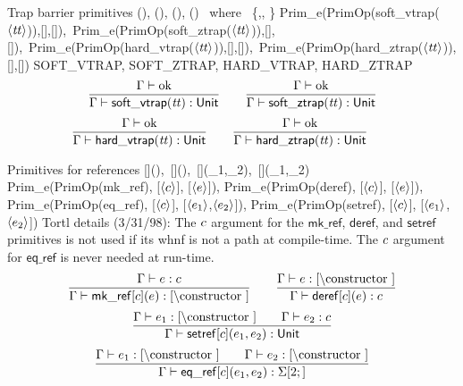\documentclass[12pt,twoside,fleqn]{article}
\begin{document}
\newcommand{\ttt}{\mathit{tt}}
  {Trap barrier primitives}
  {(\ttt),
   (\ttt),
   (\ttt),
   (\ttt)\quad
     \mbox{\ where\ } \ttt\in\{,,
                               \}}
  {Prim\_e(PrimOp(soft\_vtrap($\translate{\ttt}$)),[],[]),\
   Prim\_e(PrimOp(soft\_ztrap($\translate{\ttt}$)),[],[]),\
   Prim\_e(PrimOp(hard\_vtrap($\translate{\ttt}$)),[],[]),\
   Prim\_e(PrimOp(hard\_ztrap($\translate{\ttt}$)),[],[])}
  {SOFT\_VTRAP, SOFT\_ZTRAP, HARD\_VTRAP, HARD\_ZTRAP}
  { }
  { }
  {\[
   \frac{\validcontext{\context}}
        {\validexpression{\context}{\mathsf{soft\_vtrap}(\ttt)}{\cunit}}
   \qquad
   \frac{\validcontext{\context}}
        {\validexpression{\context}{\mathsf{soft\_ztrap}(\ttt)}{\cunit}}
   \]
   \[
   \frac{\validcontext{\context}}
        {\validexpression{\context}{\mathsf{hard\_vtrap}(\ttt)}{\cunit}}
   \qquad
   \frac{\validcontext{\context}}
        {\validexpression{\context}{\mathsf{hard\_ztrap}(\ttt)}{\cunit}}
   \qquad
   \] }

  {Primitives for references}
  {[\constructor](\expression),\
   [\constructor](\expression),\
   [\constructor](\expression_1,\expression_2),\
   [\constructor](\expression_1,\expression_2)}
  {Prim\_e(PrimOp(mk\_ref), [$\langle{c}\rangle$], 
       [$\langle{e}\rangle$]),
   Prim\_e(PrimOp(deref), [$\langle{c}\rangle$], 
       [$\langle{e}\rangle$]),
   Prim\_e(PrimOp(eq\_ref), [$\langle{c}\rangle$], 
       [$\langle{e_1}\rangle$,$\langle{e_2}\rangle$]),
   Prim\_e(PrimOp(setref), [$\langle{c}\rangle$], 
       [$\langle{e_1}\rangle$,$\langle{e_2}\rangle$])}
  {}
  {Tortl details (3/31/98):
   The $c$ argument for the $\mathsf{mk\_ref}$, $\mathsf{deref}$,
   and $\mathsf{setref}$ primitives is not used if its whnf is
   not a path at compile-time.  The $c$ argument for
   $\mathsf{eq\_ref}$ is never needed at run-time. }
  {\[
   \frac{\validexpression{\context}{\expression}{\constructor}}
        {\validexpression{\context}
             {\mathsf{mk\_ref}[\constructor](\expression)}
             {\cref{\constructor}}}
   \qquad
   \frac{\validexpression{\context}{\expression}{\cref{\constructor}}}
        {\validexpression{\context}
             {\mathsf{deref}[\constructor](\expression)}
             {\constructor}}
   \]
   \[
   \frac{\validexpression{\context}{\expression_1}{\cref{\constructor}}
         \qquad
         \validexpression{\context}{\expression_2}{\constructor}}
        {\validexpression{\context}
             {\mathsf{setref}[\constructor](\expression_1,\expression_2)}
             {\cunit}}
   \]
   \[
   \frac{\validexpression{\context}{\expression_1}{\cref{\constructor}}
         \qquad
         \validexpression{\context}{\expression_2}{\cref{\constructor}}}
        {\validexpression{\context}
             {\mathsf{eq\_ref}[\constructor](\expression_1,\expression_2)}
             {\csummil{2}{}}}
   \]}
   
\end{document}
